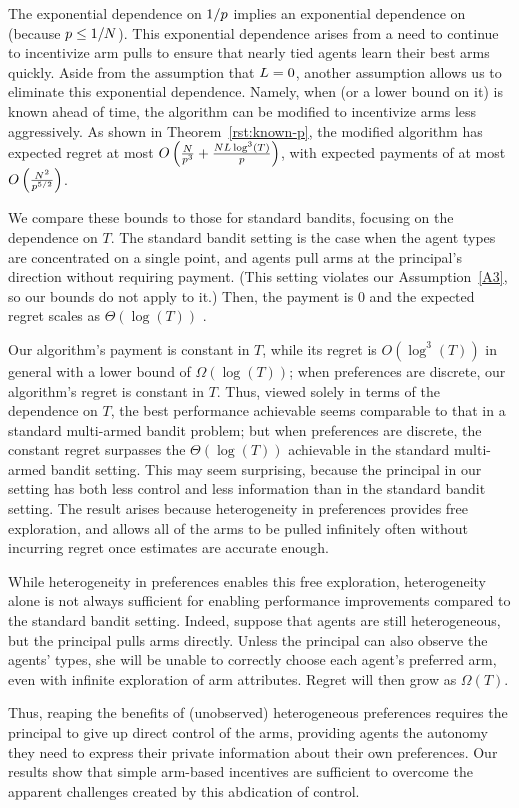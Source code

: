 The exponential dependence on $1/p$ implies an exponential
dependence on \ARMNUM (because $p \leq 1/N$).
This exponential dependence arises from a need to continue to
incentivize arm pulls to ensure that nearly tied agents learn their
best arms quickly.
Aside from the assumption that $L = 0$, another assumption
allows us to eliminate this exponential dependence.
Namely, when \MinProb (or a lower bound on it) is known ahead of time,
the algorithm can be modified to incentivize arms less aggressively.
As shown in Theorem~\ref{rst:known-p},
the modified algorithm has expected regret at most
$O \left(\frac{N}{p^3}
+\frac{N L \log^3(T)}{p} \right)$,
with expected payments of at most
$O \left(\frac{N^2}{p^{5/2}} \right)$.

We compare these bounds to those for standard bandits,
focusing on the dependence on $T$.  
The standard bandit setting is the case when the agent types \AgV
are concentrated on a single point, and agents pull arms at the
principal's direction without requiring payment.
(This setting violates our Assumption~\ref{A3},
so our bounds do not apply to it.)
Then, the payment is $0$ and the expected regret scales as
$\Theta(\log(T))$ \cite[Theorem 2.1]{bubeck2012regret}.

Our algorithm's payment is constant in $T$,
while its regret is $O(\log^3(T))$ in general with a lower bound of
$\Omega(\log(T))$;
when preferences are discrete, our algorithm's regret is
constant in $T$.
Thus, viewed solely in terms of the dependence on $T$,
the best performance achievable seems comparable to that in a standard
multi-armed bandit problem;
but when preferences are discrete, the constant regret
surpasses the $\Theta(\log(T))$ achievable in the standard multi-armed
bandit setting.
This may seem surprising, because the principal in our setting has
both less control and less information than in the standard bandit setting.
The result arises because heterogeneity in preferences provides
free exploration, and allows all of the arms to be pulled infinitely
often without incurring regret once estimates are accurate enough.

While heterogeneity in preferences enables this free exploration,
heterogeneity alone is not always sufficient for enabling performance
improvements compared to the standard bandit setting.
Indeed, suppose that agents are still heterogeneous,
but the principal pulls arms directly.
Unless the principal can also observe the agents' types,
she will be unable to correctly choose each agent's preferred arm,
even with infinite exploration of arm attributes.
Regret will then grow as $\Omega(T)$. 

Thus, reaping the benefits of (unobserved) heterogeneous preferences
requires the principal to give up direct control of the arms,
providing agents the autonomy they need to express their private
information about their own preferences.
Our results show that simple arm-based incentives are sufficient
to overcome the apparent challenges created by this abdication of
control.
